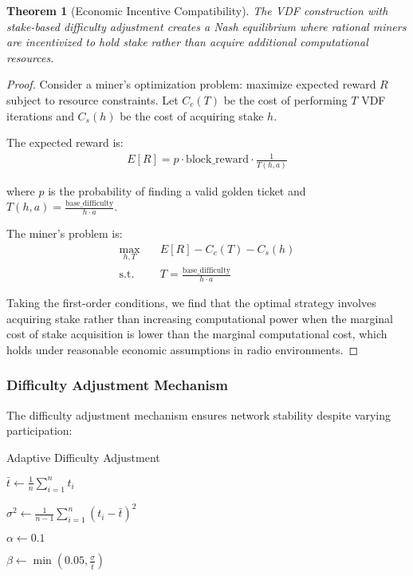 \documentclass[11pt,a4paper]{article}
\newtheorem{theorem}{Theorem}[section]
\begin{document}
\begin{theorem}[Economic Incentive Compatibility]
The VDF construction with stake-based difficulty adjustment creates a Nash equilibrium where rational miners are incentivized to hold stake rather than acquire additional computational resources.
\end{theorem}

\begin{proof}
Consider a miner's optimization problem: maximize expected reward $R$ subject to resource constraints. Let $C_c(T)$ be the cost of performing $T$ VDF iterations and $C_s(h)$ be the cost of acquiring stake $h$.

The expected reward is:
\begin{align}
E[R] = p \cdot \text{block\_reward} \cdot \frac{1}{T(h,a)}
\end{align}

where $p$ is the probability of finding a valid golden ticket and $T(h,a) = \frac{\text{base\_difficulty}}{h \cdot a}$.

The miner's problem is:
\begin{align}
\max_{h,T} \quad & E[R] - C_c(T) - C_s(h) \\
\text{s.t.} \quad & T = \frac{\text{base\_difficulty}}{h \cdot a}
\end{align}

Taking the first-order conditions, we find that the optimal strategy involves acquiring stake rather than increasing computational power when the marginal cost of stake acquisition is lower than the marginal computational cost, which holds under reasonable economic assumptions in radio environments.
\end{proof}

\subsubsection{Difficulty Adjustment Mechanism}

The difficulty adjustment mechanism ensures network stability despite varying participation:

\begin{algorithm}[H]
\SetAlgoLined
{}
\caption{Adaptive Difficulty Adjustment}

$\bar{t} \leftarrow \frac{1}{n} \sum_{i=1}^n t_i$ 

$\sigma^2 \leftarrow \frac{1}{n-1} \sum_{i=1}^n (t_i - \bar{t})^2$ 

$\alpha \leftarrow 0.1$ 

$\beta \leftarrow \min(0.05, \frac{\sigma}{\bar{t}})$ 


\end{algorithm}
\end{document}
